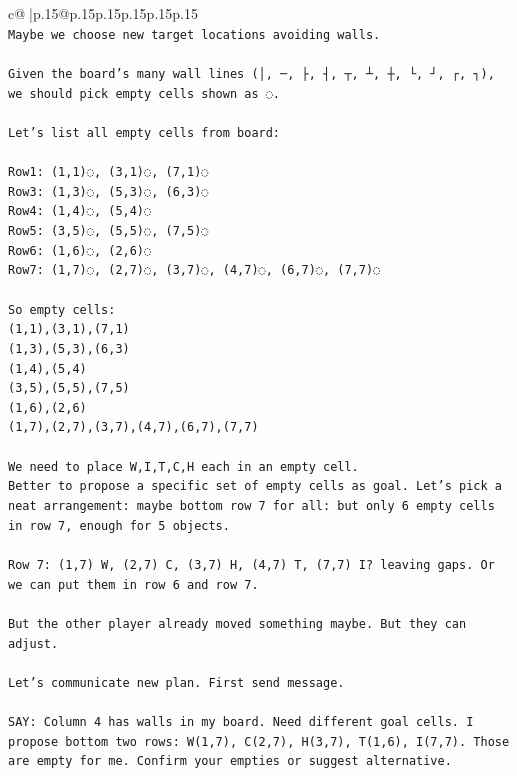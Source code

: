 \documentclass{article}
\begin{document}
{\begin{supertabular}{c@{$\;$}|p{.15\linewidth}@{}p{.15\linewidth}p{.15\linewidth}p{.15\linewidth}p{.15\linewidth}p{.15\linewidth}}
{{{\\ 
\texttt{Maybe we choose new target locations avoiding walls.} \\
\\ 
\texttt{Given the board's many wall lines (│, ─, ├, ┤, ┬, ┴, ┼, └, ┘, ┌, ┐), we should pick empty cells shown as ◌.} \\
\\ 
\texttt{Let’s list all empty cells from board:} \\
\\ 
\texttt{Row1: (1,1)◌, (3,1)◌, (7,1)◌  } \\
\texttt{Row3: (1,3)◌, (5,3)◌, (6,3)◌  } \\
\texttt{Row4: (1,4)◌, (5,4)◌  } \\
\texttt{Row5: (3,5)◌, (5,5)◌, (7,5)◌  } \\
\texttt{Row6: (1,6)◌, (2,6)◌  } \\
\texttt{Row7: (1,7)◌, (2,7)◌, (3,7)◌, (4,7)◌, (6,7)◌, (7,7)◌  } \\
\\ 
\texttt{So empty cells:  } \\
\texttt{(1,1),(3,1),(7,1)  } \\
\texttt{(1,3),(5,3),(6,3)  } \\
\texttt{(1,4),(5,4)  } \\
\texttt{(3,5),(5,5),(7,5)  } \\
\texttt{(1,6),(2,6)  } \\
\texttt{(1,7),(2,7),(3,7),(4,7),(6,7),(7,7)} \\
\\ 
\texttt{We need to place W,I,T,C,H each in an empty cell.  } \\
\texttt{Better to propose a specific set of empty cells as goal. Let's pick a neat arrangement: maybe bottom row 7 for all: but only 6 empty cells in row 7, enough for 5 objects.} \\
\\ 
\texttt{Row 7: (1,7) W, (2,7) C, (3,7) H, (4,7) T, (7,7) I? leaving gaps. Or we can put them in row 6 and row 7.} \\
\\ 
\texttt{But the other player already moved something maybe. But they can adjust.} \\
\\ 
\texttt{Let’s communicate new plan. First send message.} \\
\\ 
\texttt{SAY: Column 4 has walls in my board. Need different goal cells. I propose bottom two rows: W(1,7), C(2,7), H(3,7), T(1,6), I(7,7). Those are empty for me. Confirm your empties or suggest alternative.} \\
            }
        }
    }
     \\ \\


\end{supertabular}}
\end{document}
